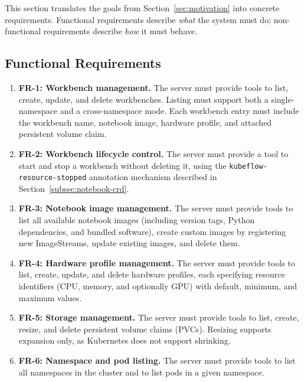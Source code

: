 \documentclass[
  digital,     %
  oneside,     %
  nosansbold,  %
  nocolorbold, %
  lof,         %
  lot,         %
]{fithesis4}
\begin{document}
This section translates the goals from Section~\ref{sec:motivation} into
concrete requirements. Functional requirements describe \emph{what} the
system must do; non-functional requirements describe \emph{how} it must
behave.

\subsection{Functional Requirements}
\label{subsec:functional-req}

\begin{enumerate}
  \item \textbf{FR-1: Workbench management.} The server must provide tools to
        list, create, update, and delete workbenches. Listing must support
        both a single-namespace and a cross-namespace mode. Each workbench
        entry must include the workbench name, notebook image, hardware profile, and attached
        persistent volume claim.

  \item \textbf{FR-2: Workbench lifecycle control.} The server must provide
        a tool to start and stop a workbench without deleting it, using the
        \texttt{kubeflow-resource-stopped} annotation mechanism described in
        Section~\ref{subsec:notebook-crd}.

  \item \textbf{FR-3: Notebook image management.} The server must provide
        tools to list all available notebook images (including version tags,
        Python dependencies, and bundled software), create custom images by
        registering new ImageStreams, update existing images, and delete them.

  \item \textbf{FR-4: Hardware profile management.} The server must provide
        tools to list, create, update, and delete hardware profiles, each
        specifying resource identifiers (CPU, memory, and optionally GPU)
        with default, minimum, and maximum values.

  \item \textbf{FR-5: Storage management.} The server must provide tools to
        list, create, resize, and delete persistent volume claims (PVCs).
        Resizing supports expansion only, as Kubernetes does not support
        shrinking.

  \item \textbf{FR-6: Namespace and pod listing.} The server must provide
        tools to list all namespaces in the cluster and to list pods in a
        given namespace.


\end{enumerate}
\end{document}
